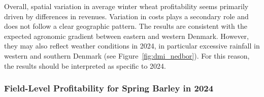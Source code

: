 \documentclass[12pt]{article}
\begin{document}
Overall, spatial variation in average winter wheat profitability seems primarily driven by differences in revenues. 
Variation in costs plays a secondary role and does not follow a clear geographic pattern. 
The results are consistent with the expected agronomic gradient between eastern and western Denmark. 
However, they may also reflect weather conditions in 2024, in particular excessive rainfall in western and southern Denmark (see Figure~\ref{fig:dmi_nedbor}). 
For this reason, the results should be interpreted as specific to 2024. 



\subsubsection{Field-Level Profitability for Spring Barley in 2024} 
\end{document}
